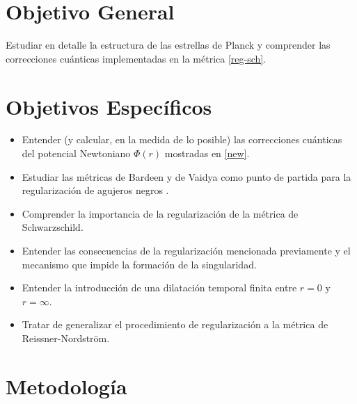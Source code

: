 \documentclass[prb,aps,preprintnumbers,amsmath,amssymb]{article}
\begin{document}
\section{Objetivo General}


Estudiar en detalle la estructura de las estrellas de Planck y comprender las correcciones cuánticas implementadas en la métrica \eqref{reg-sch}.


\section{Objetivos Específicos}


\begin{itemize}
	\item Entender (y calcular, en la medida de lo posible) las correcciones cuánticas del potencial Newtoniano $\Phi (r)$ mostradas en \eqref{new}.
	\item Estudiar las métricas de Bardeen y de Vaidya como punto de partida para la regularización de agujeros negros \cite{vaidya}.
	\item Comprender la importancia de la regularización de la métrica de Schwarzschild.
	\item Entender las consecuencias de la regularización mencionada previamente y el mecanismo que impide la formación de la singularidad.
	\item Entender la introducción de una dilatación temporal finita entre $r = 0$ y $r = \infty$.
	\item Tratar de generalizar el procedimiento de regularización a la métrica de Reissner-Nordström.
\end{itemize}

\section{Metodología}



\end{document}
